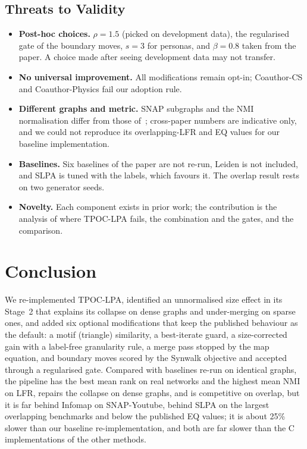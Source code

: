 \documentclass[conference]{IEEEtran}
\begin{document}
\subsection{Threats to Validity}\label{sec:limits}
\begin{itemize}
\item \textbf{Post-hoc choices.} $\rho=1.5$ (picked on development data), the regularised gate of the boundary moves, $s=3$ for personas, and $\beta=0.8$ taken from the paper. A choice made after seeing development data may not transfer.
\item \textbf{No universal improvement.} All modifications remain opt-in; Coauthor-CS and Coauthor-Physics fail our adoption rule.
\item \textbf{Different graphs and metric.} SNAP subgraphs and the NMI normalisation differ from those of~\cite{kong2026}; cross-paper numbers are indicative only, and we could not reproduce its overlapping-LFR and EQ values for our baseline implementation.
\item \textbf{Baselines.} Six baselines of the paper are not re-run, Leiden is not included, and SLPA is tuned with the labels, which favours it. The overlap result rests on two generator seeds.
\item \textbf{Novelty.} Each component exists in prior work; the contribution is the analysis of where TPOC-LPA fails, the combination and the gates, and the comparison.
\end{itemize}

\section{Conclusion}
We re-implemented TPOC-LPA, identified an unnormalised size effect in its Stage~2 that explains its collapse on dense graphs and under-merging on sparse ones, and added six optional modifications that keep the published behaviour as the default: a motif (triangle) similarity, a best-iterate guard, a size-corrected gain with a label-free granularity rule, a merge pass stopped by the map equation, and boundary moves scored by the Synwalk objective and accepted through a regularised gate. Compared with baselines re-run on identical graphs, the pipeline has the best mean rank on real networks and the highest mean NMI on LFR, repairs the collapse on dense graphs, and is competitive on overlap, but it is far behind Infomap on SNAP-Youtube, behind SLPA on the largest overlapping benchmarks and below the published EQ values; it is about 25\% slower than our baseline re-implementation, and both are far slower than the C implementations of the other methods.
\end{document}
